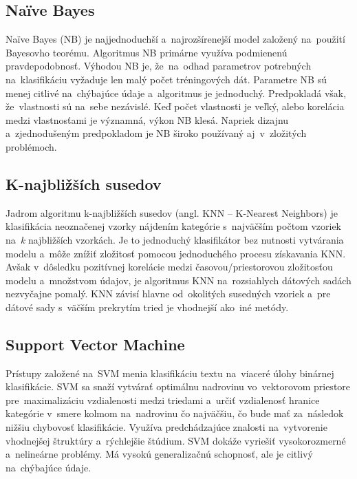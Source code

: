 \subsection*{Naïve Bayes}
Naïve Bayes (NB) je najjednoduchší a~najrozšírenejší model založený na~použití Bayesovho teorému. Algoritmus NB primárne využíva podmienenú pravdepodobnosť. Výhodou NB je, že~na~odhad parametrov potrebných na~klasifikáciu vyžaduje len malý počet tréningových dát. Parametre NB sú menej citlivé na~chýbajúce údaje a~algoritmus je jednoduchý. Predpokladá však, že~vlastnosti sú na~sebe nezávislé. Keď počet vlastnosti je veľký, alebo korelácia medzi vlastnosťami je významná, výkon NB klesá. Napriek  dizajnu a~zjednodušeným predpokladom je NB široko používaný aj~v~zložitých problémoch.

\subsection*{K-najbližších susedov}
Jadrom algoritmu k-najbližších susedov (angl. KNN -- K-Nearest Neighbors) je klasifikácia neoznačenej vzorky nájdením kategórie s~najväčším počtom vzoriek na~\textit{k} najbližších vzorkách. Je to jednoduchý klasifikátor bez nutnosti vytvárania modelu a~môže znížiť zložitosť pomocou jednoduchého procesu získavania KNN. Avšak v~dôsledku pozitívnej korelácie medzi časovou/priestorovou zložitosťou modelu a~množstvom údajov, je algoritmus KNN na~rozsiahlych dátových sadách nezvyčajne pomalý. KNN závisí hlavne od~okolitých susedných vzoriek a~pre dátové sady s~väčším prekrytím tried  je vhodnejší ako~iné metódy.

\subsection*{Support Vector Machine}
Prístupy založené na~SVM menia klasifikáciu textu na~viaceré úlohy binárnej klasifikácie. SVM sa snaží vytvárať optimálnu nadrovinu vo~vektorovom priestore pre~maximalizáciu vzdialenosti medzi triedami a~určiť vzdialenosť hranice kategórie v~smere kolmom na~nadrovinu čo najväčšiu, čo bude mať za~následok nižšiu chybovosť klasifikácie. Využíva predchádzajúce znalosti na~vytvorenie vhodnejšej štruktúry a~rýchlejšie štúdium. SVM dokáže vyriešiť vysokorozmerné a~nelineárne problémy. Má vysokú generalizačnú schopnosť, ale je citlivý na~chýbajúce údaje.

